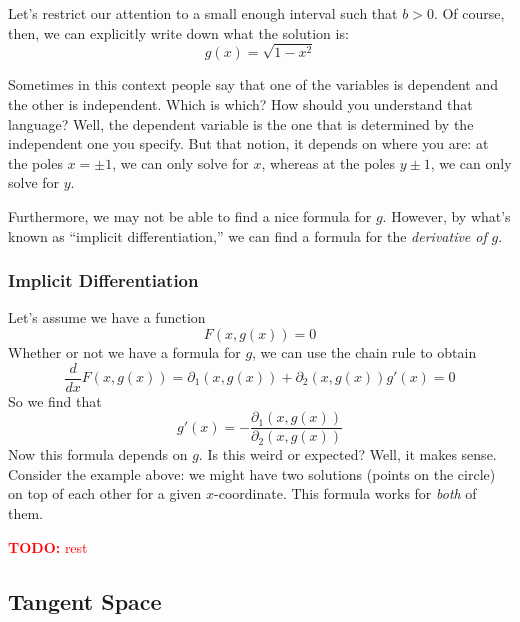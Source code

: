 \documentclass{article}
\newcommand{\TODO}[1]{\textcolor{red}{\textbf{TODO:} #1}}
\begin{document}
Let's restrict our attention to a small enough interval such that \(b > 0\). Of course, then, we can explicitly write down what the solution is:
\[g(x) = \sqrt{1 - x^2}\]

Sometimes in this context people say that one of the variables is dependent and the other is independent. Which is which? How should you understand that language? Well, the dependent variable is the one that is determined by the independent one you specify. But that notion, it depends on where you are: at the poles \(x = \pm 1\), we can only solve for \(x\), whereas at the poles \(y \pm 1\), we can only solve for \(y\).

Furthermore, we may not be able to find a nice formula for \(g\). However, by what's known as ``implicit differentiation,'' we can find a formula for the \textit{derivative of} \(g\).

\subsubsection{Implicit Differentiation}
Let's assume we have a function
\[F(x, g(x)) = 0\]
Whether or not we have a formula for \(g\), we can use the chain rule to obtain
\[\frac{d}{dx}F(x, g(x)) = \partial_1(x, g(x)) + \partial_2(x, g(x))g'(x) = 0\]
So we find that
\[g'(x) = -\frac{\partial_1(x, g(x))}{\partial_2(x, g(x))}\]
Now this formula depends on \(g\). Is this weird or expected? Well, it makes sense. Consider the example above: we might have two solutions (points on the circle) on top of each other for a given \(x\)-coordinate. This formula works for \textit{both} of them.

\TODO{rest}

\subsection{Tangent Space}
\end{document}
